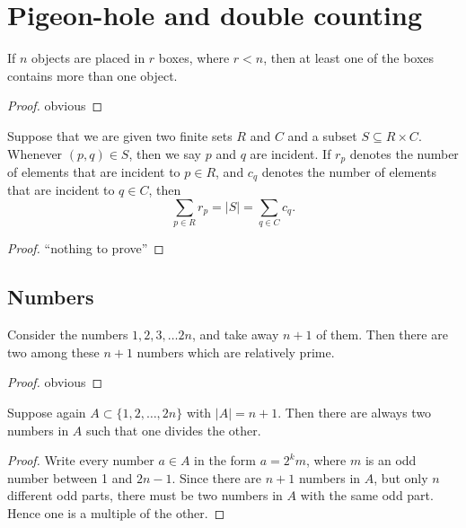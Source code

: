 \chapter{Pigeon-hole and double counting}

\begin{theorem}
  \label{pigeon_hole_principle}
  If $n$ objects are placed in $r$ boxes, where $r < n$, then at least one of the boxes contains
  more than one object.
\end{theorem}
\begin{proof}
  \leanok
  obvious
\end{proof}

\begin{theorem}
  \label{double_counting}
  Suppose that we are given two finite sets $R$ and $C$ and a subset $S \subseteq R \times C$.
  Whenever $(p, q) \in S$, then we say $p$ and $q$ are incident.
  If $r_p$ denotes the number of elements that are incident to $p \in R$, and $c_q$
  denotes the number of elements that are incident to $q \in C$, then
  \[
  \sum_{p \in R} r_p = |S| = \sum_{q \in C} c_q. \tag{3}
  \]
\end{theorem}
\begin{proof}
  ``nothing to prove''
\end{proof}

\section{Numbers}
\begin{theorem}[Claim]
  \label{ch28claim1}
  Consider the numbers $1, 2, 3, \dots 2n$, and take away $n + 1$
  of them. Then there are two among these $n + 1$ numbers which are
  relatively prime.
\end{theorem}
\begin{proof}
  obvious
\end{proof}

\begin{theorem}[Claim]
  \label{ch28claim2}
  Suppose again $A\subset\{1, 2, \dots, 2n\}$ with $|A| = n + 1$. Then
  there are always two numbers in $A$ such that one divides the other.
\end{theorem}
\begin{proof}
  Write every number $a \in A$ in the form $a = 2^k m$, where $m$ is an odd number between 1 and $2n - 1$.
  Since there are $n + 1$ numbers in $A$, but only $n$ different odd parts, there must be two numbers
  in $A$ with the same odd part. Hence one is a multiple of the other.
\end{proof}

